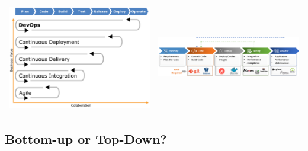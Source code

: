 \documentclass[10pt,a4paper,openright,twoside]{C:/Didattica/git/lab2014Bo/it.unibo.iss2015intro/docsInternal/contents/llncs}
\begin{document}
\medskip  
\noindent
\begin{tabular}{ | c | c | }
     \includegraphics[scale = 0.2]{img/devops0.png} & \includegraphics[scale = 0.35]{img/devops1.png}
\end{tabular}



\subsection{Bottom-up or Top-Down?}
\end{document}
